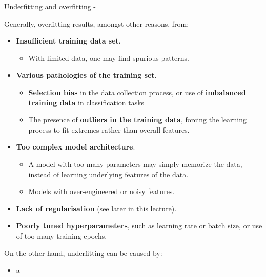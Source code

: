 \begin{frame}[t,allowframebreaks]{Underfitting and overfitting -}
     \framebreak
 
     Generally, \gls{overfitting} results, 
     amongst other reasons, from:
     \vspace{0.2cm}
     \begin{itemize}
        \item {\bf Insufficient training data set}.
        \begin{itemize}
            \item With limited data, one may find spurious patterns. 
        \end{itemize}    
        \item {\bf Various pathologies of the training set}.
        \begin{itemize}
            \item {\bf Selection bias} in the data collection process,
            or use of {\bf imbalanced training data} in classification tasks
            \item The presence of {\bf outliers in the training data},
            forcing the learning process to fit extremes rather than overall features.
        \end{itemize}    
        \item {\bf Too complex model architecture}.
        \begin{itemize}
            \item A model with too many parameters may simply memorize the
            data, instead of learning underlying features of the data.
            \item Models with over-engineered or noisy features.
        \end{itemize}    
        \item {\bf Lack of regularisation} (see later in this lecture).
        \item {\bf Poorly tuned hyperparameters}, such as learning rate or batch size,
        or use of too many training epochs.

     \end{itemize}

     \framebreak
 
     On the other hand, \gls{underfitting} can be caused by:
     \vspace{0.2cm}
     \begin{itemize}
        \item a
     \end{itemize}
  
 
 \end{frame}
 